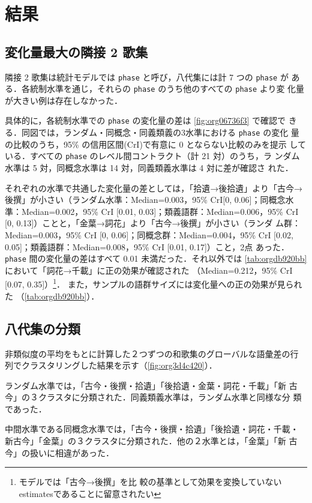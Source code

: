 \documentclass[submit]{ipsj}
\renewcommand{\ref}{\cref}
\begin{document}
\section{結果\label{orgbf09927}}
\label{sec:org101f307}
\subsection{変化量最大の隣接 2 歌集\label{org0944d9d}}
\label{sec:orgdeca7ae}
隣接 2 歌集は統計モデルでは \texttt{phase} と呼び，八代集には計 7 つの \texttt{phase} が
ある．各統制水準を通じ，それらの \texttt{phase} のうち他のすべての \texttt{phase} より変
化量が大きい例は存在しなかった．

具体的に，各統制水準での \texttt{phase} の変化量の差は \ref{fig:org06736f3} で確認で
きる．同図では，ランダム・同概念・同義類義の3水準における \texttt{phase} の変化
量の比較のうち，95\% の信用区間(CrI)で有意に 0 とならない比較のみを提示
している．すべての \texttt{phase} のレベル間コントラクト（計 21 対）のうち，ラ
ンダム水準は 5 対，同概念水準は 14 対，同義類義水準は 4 対に差が確認さ
れた．

それぞれの水準で共通した変化量の差としては，「拾遺→後拾遺」より「古今→
後撰」が小さい（ランダム水準：Median=0.003，95\% CrI[0, 0.06]；同概念水
準：Median=0.002，95\% CrI [0.01, 0.03]；類義語群：Median=0.006，95\%
CrI [0, 0.13]）ことと，「金葉→詞花」より「古今→後撰」が小さい（ランダ
ム群：Median=0.003，95\% CrI [0, 0.06]；同概念群：Median=0.004，95\% CrI
{[}0.02, 0.05]；類義語群：Median=0.008，95\% CrI [0.01, 0.17]）こと，2点
あった． \texttt{phase} 間の変化量の差はすべて 0.01 未満だった．それ以外では
\ref{tab:orgdb920bb} において「詞花→千載」に正の効果が確認された
（Median=0.212，95\% CrI [0.07, 0.35]）\footnote{モデルでは「古今→後撰」を比
較の基準として効果を変換していないestimatesであることに留意されたい}．
また，サンプルの語群サイズには変化量への正の効果が見られた
（\ref{tab:orgdb920bb}）．
\subsection{八代集の分類\label{orgcbb8c42}}
\label{sec:org38e5162}
非類似度の平均をもとに計算した２つずつの和歌集のグローバルな語彙差の行
列でクラスタリングした結果を示す（\ref{fig:org3d4c420}）．

ランダム水準では，「古今・後撰・拾遺」「後拾遺・金葉・詞花・千載」「新
古今」の３クラスタに分類された．同義類義水準は，ランダム水準と同様な分
類であった．

中間水準である同概念水準では，「古今・後撰・拾遺」「後拾遺・詞花・千載・
新古今」「金葉」の３クラスタに分類された．他の２水準とは，「金葉」「新
古今」の扱いに相違があった．
\end{document}
